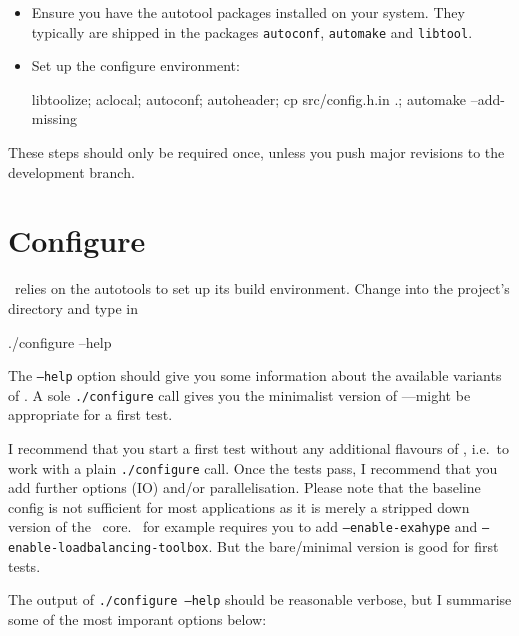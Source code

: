 \begin{itemize}
  \item Ensure you have the autotool packages installed on your system. They
  typically are shipped in the packages \texttt{autoconf}, \texttt{automake} and
  \texttt{libtool}.
  \item Set up the configure environment: 
 \begin{code}
 libtoolize; aclocal; autoconf; autoheader; 
 cp src/config.h.in .; 
 automake --add-missing
 \end{code}
\end{itemize}
\label{page::installation::configure}


\noindent
These steps should only be required once, unless you push major revisions to the
development branch.


\section{Configure}
\label{section:installation:configure}


\Peano\  relies on the autotools to set up its build environment.
Change into the project's directory and type in 
\begin{code}
./configure --help
\end{code}


\noindent
The \texttt{--help} option should give you some information about the available
variants of \Peano.
A sole \texttt{./configure} call gives you the minimalist version of
\Peano---might be appropriate for a first test.

\begin{remark}
 I recommend that you start a first test without any additional flavours of
 \Peano, i.e.~to work with a plain \texttt{./configure} call. Once the tests
 pass, I recommend that you add further options (IO) and/or parallelisation.
 Please note that the baseline config is not sufficient for most applications
 as it is merely a stripped down version of the \Peano\ core.
 \ExaHyPE\ for example requires you to add \texttt{--enable-exahype} and
 \texttt{--enable-loadbalancing-toolbox}. 
 But the bare/minimal version is good for first tests.
\end{remark}


\noindent
The output of \texttt{./configure --help} should be reasonable verbose, but I
summarise some of the most imporant options below:

